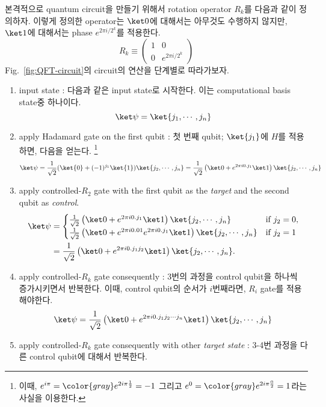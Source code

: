 \vspace{1em}
본격적으로 quantum circuit을 만들기 위해서 rotation operator $R_k$를 다음과 같이 정의하자. 이렇게 정의한 operator는 $\ket 0$에 대해서는 아무것도 수행하지 않지만, $\ket 1$에 대해서는 phase $e^{2\pi i / 2^k}$를 적용한다.
\begin{equation*}
  R_k \equiv\left(\begin{array}{cc}
  1 & 0 \\
  0 & e^{2 \pi i / 2^k}
  \end{array}\right)
\end{equation*}
Fig.~\ref{fig:QFT-circuit}의 circuit의 연산을 단계별로 따라가보자.
\begin{enumerate}
  \item input state : 다음과 같은 input state로 시작한다. 이는 computational basis state중 하나이다.
  \begin{equation*}
    \ket \psi = \ket{j_1,\cdots, j_n}
  \end{equation*}
  \item apply Hadamard gate on the first qubit : 첫 번째 qubit; $\ket{j_1}$에 $H$를 적용하면, 다음을 얻는다.
  \footnote{이때, $e^{i\pi} = {\color{gray}e^{2i\pi \frac{1}{2}}} = -1$ 그리고 $e^{0} = {\color{gray}e^{2i\pi \frac{0}{2}}} = 1$라는 사실을 이용한다.}
  \begin{equation*}
    \ket \psi = \frac{1}{\sqrt 2} (\ket{0} + (-1)^{j_1}\ket{1})\ket{j_2, \cdots, j_n} = \frac{1}{\sqrt 2} \left( \ket 0 + e^{2\pi i 0.j_1} \ket 1 \right) \ket{j_2, \cdots, j_n}
  \end{equation*}
  \item apply controlled-$R_2$ gate with the first qubit as the \textit{target} and the second qubit as \textit{control}.
  \begin{align*}
    \ket \psi &= \begin{cases} 
        \frac{1}{\sqrt 2} \left( \ket 0 + e^{2\pi i 0.j_1} \ket 1 \right) \ket{j_2, \cdots, j_n} & \text{if } j_2 = 0, \\ 
        \frac{1}{\sqrt 2} \left( \ket 0 + e^{2\pi i 0.01} e^{2\pi i 0.j_1} \ket 1 \right) \ket{j_2, \cdots, j_n} & \text{if } j_2 = 1 
    \end{cases}\\ 
              &= \frac{1}{\sqrt 2} \left( \ket 0 + e^{2\pi i 0.j_1j_2} \ket 1 \right) \ket{j_2, \cdots, j_n}.
\end{align*}
\newpage
  \item apply controlled-$R_k$ gate consequently : 3번의 과정을 control qubit을 하나씩 증가시키면서 반복한다. 이때, control qubit의 순서가 $i$번째라면, $R_i$ gate를 적용해야한다.
  \begin{equation*}
    \ket \psi = \frac{1}{\sqrt 2} \left( \ket 0 + e^{2\pi i 0.j_1j_2 \cdots j_n} \ket 1 \right) \ket{j_2, \cdots, j_n} 
  \end{equation*}
  \item apply controlled-$R_k$ gate consequently with other \textit{target state}  : 3-4번 과정을 다른 control qubit에 대해서 반복한다. 
  

\end{enumerate}
